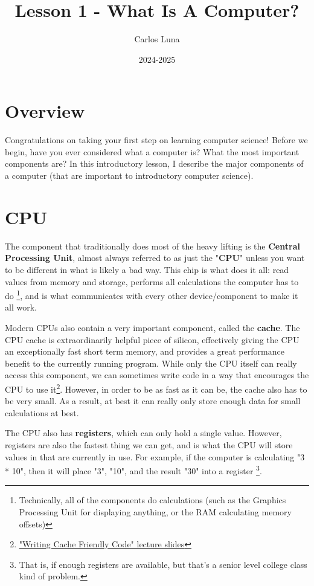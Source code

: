 \documentclass[11pt]{article}
\title{Lesson 1 - What Is A Computer?}
\author{Carlos Luna}
\date{2024-2025}
\begin{document}
\maketitle
\tableofcontents

\newpage

\section{Overview}
Congratulations on taking your first step on learning computer science! Before we begin, have you ever considered what a computer is? What the most important components are?
In this introductory lesson, I describe the major components of a computer (that are important to introductory computer science).

\section{CPU}
The component that traditionally does most of the heavy lifting is the \textbf{Central Processing Unit}, almost always referred to as just the "\textbf{CPU}" unless you want to be different in what is likely a bad way.
This chip is what does it all: 
    read values from memory and storage, 
    performs all calculations the computer has to do
    \footnote{Technically, all of the components do calculations (such as the Graphics Processing Unit for displaying anything, or the RAM calculating memory offsets)}, 
    and is what communicates with every other device/component to make it all work.

Modern CPUs also contain a very important component, called the \textbf{cache}.
The CPU cache is extraordinarily helpful piece of silicon, effectively giving the CPU an exceptionally fast short term memory, and provides a great performance benefit to the currently running program.
While only the CPU itself can really access this component, we can sometimes write code in a way that encourages the CPU to use it\footnote{\href{https://courses.grainger.illinois.edu/cs232/sp2009/lectures/X18.pdf}{"Writing Cache Friendly Code" lecture slides}}.
However, in order to be as fast as it can be, the cache also has to be very small. As a result, at best it can really only store enough data for small calculations at best.

The CPU also has \textbf{registers}, which can only hold a single value. However, registers are also the fastest thing we can get, and is what the CPU will store values in that are currently in use. 
For example, if the computer is calculating "3 * 10", then it will place "3",  "10", and the result "30" into a register
\footnote{That is, if enough registers are available, but that's a senior level college class kind of problem.}.
\end{document}

